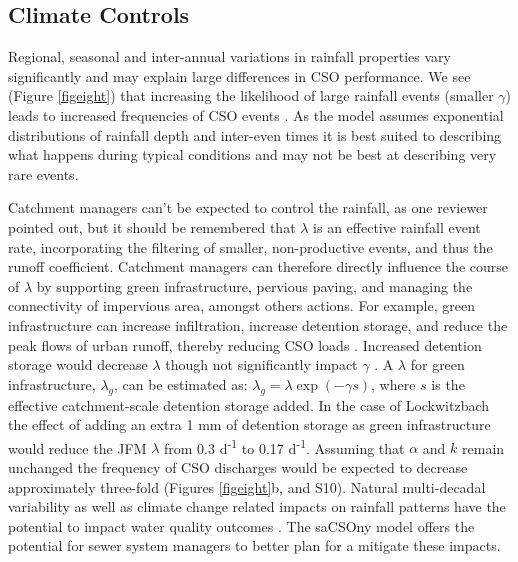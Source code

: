 \documentclass{agujournal2018}
\begin{document}
\subsection{Climate Controls}
Regional, seasonal and inter-annual variations in rainfall properties vary signif\/icantly and may explain large dif\/ferences in CSO performance. We see (Figure \ref{figeight}) that increasing the likelihood of large rainfall events (smaller $\gamma$) leads to increased frequencies of CSO events \cite{Sterk_2016}. As the model assumes exponential distributions of rainfall depth and inter-even times it is best suited to describing what happens during typical conditions and may not be best at describing very rare events.

Catchment managers can't be expected to control the rainfall, as one reviewer pointed out, but it should be remembered that $\lambda$ is an effective rainfall event rate, incorporating the filtering of smaller, non-productive events, and thus the runoff coefficient.  Catchment managers can therefore directly influence the course of $\lambda$ by supporting green infrastructure, pervious paving, and managing the connectivity of impervious area, amongst others actions. For example, green infrastructure can increase inf\/iltration, increase detention storage, and reduce the peak f\/lows of urban runof\/f, thereby reducing CSO loads \citep{Riechel_2016}. Increased detention storage would decrease $\lambda$ though not signif\/icantly impact $\gamma$ \citep{Rodriguez_Iturbe_1999}. A $\lambda$ for green infrastructure, $\lambda_g$, can be estimated as: $\lambda_g = \lambda \exp⁡(-\gamma s)$, where $s$ is the ef\/fective catchment-scale detention storage added. In the case of Lockwitzbach the ef\/fect of adding an extra 1 mm of detention storage as green infrastructure would reduce the JFM $\lambda$ from 0.3 d\textsuperscript{-1} to 0.17 d\textsuperscript{-1}. Assuming that $\alpha$ and $k$ remain unchanged the frequency of CSO discharges would be expected to decrease approximately three-fold (Figures \ref{figeight}b, and S10). Natural multi-decadal variability as well as climate change related impacts on rainfall patterns have the potential to impact water quality outcomes \citep{mellander2018integrated, Semadeni_Davies_2008, Sterk_2016}. The saCSOny model offers the potential for sewer system managers to better plan for a mitigate these impacts.
\end{document}
